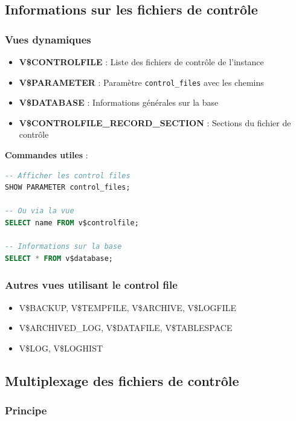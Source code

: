 \documentclass[12pt,a4paper]{article}
\begin{document}
\subsection{Informations sur les fichiers de contrôle}

\subsubsection{Vues dynamiques}

\begin{itemize}
    \item \textbf{V\$CONTROLFILE} : Liste des fichiers de contrôle de l'instance
    \item \textbf{V\$PARAMETER} : Paramètre \texttt{control\_files} avec les chemins
    \item \textbf{V\$DATABASE} : Informations générales sur la base
    \item \textbf{V\$CONTROLFILE\_RECORD\_SECTION} : Sections du fichier de contrôle
\end{itemize}

\textbf{Commandes utiles} :
\begin{lstlisting}[language=SQL]
-- Afficher les control files
SHOW PARAMETER control_files;

-- Ou via la vue
SELECT name FROM v$controlfile;

-- Informations sur la base
SELECT * FROM v$database;
\end{lstlisting}

\subsubsection{Autres vues utilisant le control file}

\begin{itemize}
    \item V\$BACKUP, V\$TEMPFILE, V\$ARCHIVE, V\$LOGFILE
    \item V\$ARCHIVED\_LOG, V\$DATAFILE, V\$TABLESPACE
    \item V\$LOG, V\$LOGHIST
\end{itemize}

\subsection{Multiplexage des fichiers de contrôle}

\subsubsection{Principe}
\end{document}
